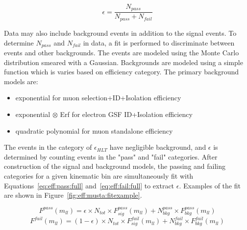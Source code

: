 \begin{equation}
\epsilon = \frac{N_{pass}}{N_{pass}+N_{fail}}
\label{eq:eff:eq}
\end{equation}

Data may also include background events in addition to the \zll signal events. To determine $N_{pass}$ and $N_{fail}$ in data, a fit is performed to discriminate between \zll events and other backgrounds. The \zll events are modeled using the Monte Carlo distribution smeared with a Gaussian. Backgrounds are modeled using a simple function which is varies based on efficiency category. The primary background models are:



\begin{itemize}
\item exponential for muon selection+ID+Isolation efficiency
\item exponential $\otimes$ Erf for electron GSF ID+Isolation efficiency
\item quadratic polynomial for muon standalone efficiency
\end{itemize}

The events in the category of $\epsilon_{HLT}$ have negligible background, and $\epsilon$ is determined by counting events in the "pass" and "fail" categories.
After construction of the signal and background models, the passing and failing categories for a given kinematic bin are simultaneously fit with Equations~\ref{eq:eff:pass:full} and~\ref{eq:eff:fail:full} to extract $\epsilon$. Examples of the fit are shown in Figure~\ref{fig:eff:musta:fitexample}.

\begin{equation}
F^{pass}\left(m_{ll}\right)=\epsilon \times N_{tot} \times F_{sig}^{pass}\left(m_{ll} \right) + N^{pass}_{bkg} \times F_{bkg}^{pass} \left(m_{ll} \right)
\label{eq:eff:pass:full}
\end{equation}
\begin{equation}
F^{fail}\left(m_{ll}\right)=\left(1-\epsilon\right) \times N_{tot} \times F_{sig}^{fail}\left(m_{ll} \right) + N^{fail}_{bkg} \times F_{bkg}^{fail} \left(m_{ll} \right)
\label{eq:eff:fail:full}
\end{equation}





